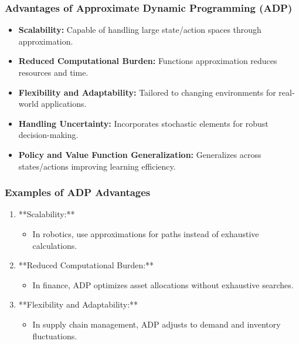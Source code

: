\documentclass[aspectratio=169]{beamer}
\begin{document}
\begin{frame}[fragile]
    \frametitle{Advantages of Approximate Dynamic Programming (ADP)}
    \begin{itemize}
        \item \textbf{Scalability:} Capable of handling large state/action spaces through approximation.
        \item \textbf{Reduced Computational Burden:} Functions approximation reduces resources and time.
        \item \textbf{Flexibility and Adaptability:} Tailored to changing environments for real-world applications.
        \item \textbf{Handling Uncertainty:} Incorporates stochastic elements for robust decision-making.
        \item \textbf{Policy and Value Function Generalization:} Generalizes across states/actions improving learning efficiency.
    \end{itemize}
\end{frame}

\begin{frame}[fragile]
    \frametitle{Examples of ADP Advantages}
    \begin{enumerate}
        \item **Scalability:** 
            \begin{itemize}
                \item In robotics, use approximations for paths instead of exhaustive calculations.
            \end{itemize}
        \item **Reduced Computational Burden:** 
            \begin{itemize}
                \item In finance, ADP optimizes asset allocations without exhaustive searches.
            \end{itemize}
        \item **Flexibility and Adaptability:** 
            \begin{itemize}
                \item In supply chain management, ADP adjusts to demand and inventory fluctuations.
            \end{itemize}
    \end{enumerate}
\end{frame}
\end{document}
